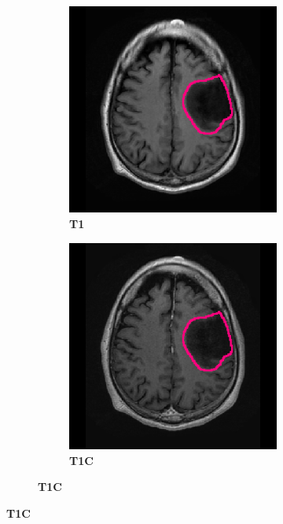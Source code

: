 \begin{subappendices}
\begin{figure}[htbp]
    \centering
    \begin{subfigure}[b]{0.8\textwidth}
        \centering
        \hfill
        \begin{subfigure}[b]{0.215\textwidth}
        \caption*{\normalfont \textbf{\acrshort{T1}}\nopunct}
        \includegraphics[width=\textwidth, clip, trim=2.5cm 0.5cm 2.5cm 0.5cm]{Figures/Random_segs/T1_TCGA-DU-7301.png}
        \end{subfigure}
        \hfill
        \begin{subfigure}[b]{0.215\textwidth}
        \caption*{\normalfont \textbf{\acrshort{T1C}}\nopunct}
        \includegraphics[width=\textwidth, clip, trim=2.5cm 0.5cm 2.5cm 0.5cm]{Figures/Random_segs/T1GD_TCGA-DU-7301.png}

\end{subfigure}
\end{subfigure}
\end{figure}
\end{subappendices}
